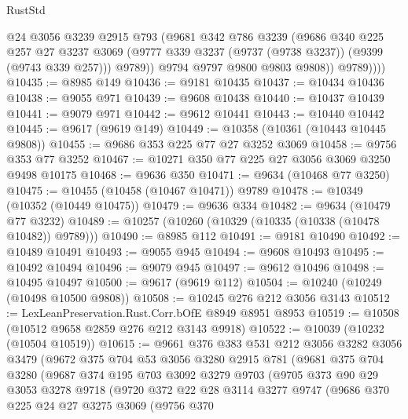 \begin{lexlean}{RustStd}
\begin{coremodule}
                @24
                @3056
                @3239
                @2915
                @793
                (@9681
                  @342
                  @786
                  @3239
                  (@9686
                    @340
                    @225
                    @257
                    @27
                    @3237
                    @3069
                    (@9777 @339 @3237 (@9737 (@9738 @3237)) (@9399 (@9743 @339 @257)))
                    @9789))
                @9794
                @9797
                @9800
                @9803
                @9808))
            @9789))))
@10435 := @8985 @149
@10436 := @9181 @10435
@10437 := @10434 @10436
@10438 := @9055 @971
@10439 := @9608 @10438
@10440 := @10437 @10439
@10441 := @9079 @971
@10442 := @9612 @10441
@10443 := @10440 @10442
@10445 := @9617 (@9619 @149)
@10449 := @10358 (@10361 (@10443 @10445 @9808))
@10455 := @9686 @353 @225 @77 @27 @3252 @3069
@10458 := @9756 @353 @77 @3252
@10467 := @10271 @350 @77 @225 @27 @3056 @3069 @3250 @9498 @10175
@10468 := @9636 @350
@10471 := @9634 (@10468 @77 @3250)
@10475 := @10455 (@10458 (@10467 @10471)) @9789
@10478 := @10349 (@10352 (@10449 @10475))
@10479 := @9636 @334
@10482 := @9634 (@10479 @77 @3232)
@10489 := @10257 (@10260 (@10329 (@10335 (@10338 (@10478 @10482)) @9789)))
@10490 := @8985 @112
@10491 := @9181 @10490
@10492 := @10489 @10491
@10493 := @9055 @945
@10494 := @9608 @10493
@10495 := @10492 @10494
@10496 := @9079 @945
@10497 := @9612 @10496
@10498 := @10495 @10497
@10500 := @9617 (@9619 @112)
@10504 := @10240 (@10249 (@10498 @10500 @9808))
@10508 := @10245 @276 @212 @3056 @3143
@10512 := LexLeanPreservation.Rust.Corr.bOfE @8949 @8951 @8953
@10519 := @10508 (@10512 @9658 @2859 @276 @212 @3143 @9918)
@10522 := @10039 (@10232 (@10504 @10519))
@10615 := @9661
    @376
    @383
    @531
    @212
    @3056
    @3282
    @3056
    @3479
    (@9672
      @375
      @704
      @53
      @3056
      @3280
      @2915
      @781
      (@9681
        @375
        @704
        @3280
        (@9687
          @374
          @195
          @703
          @3092
          @3279
          @9703
          (@9705
            @373
            @90
            @29
            @3053
            @3278
            @9718
            (@9720
              @372
              @22
              @28
              @3114
              @3277
              @9747
              (@9686
                @370
                @225
                @24
                @27
                @3275
                @3069
                (@9756
                  @370

\end{coremodule}
\end{lexlean}
